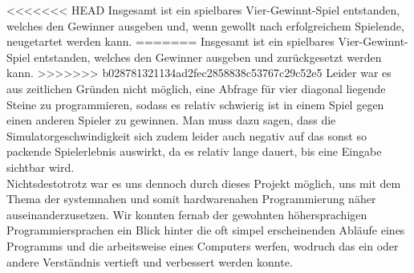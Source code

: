 <<<<<<< HEAD
Insgesamt ist ein spielbares Vier-Gewinnt-Spiel entstanden, welches den Gewinner ausgeben und, wenn gewollt nach erfolgreichem Spielende, neugetartet werden kann.
=======
Insgesamt ist ein spielbares Vier-Gewinnt-Spiel entstanden, welches den Gewinner ausgeben und zurückgesetzt werden kann.
>>>>>>> b028781321134ad2fec2858838c53767c29c52e5
Leider war es aus zeitlichen Gründen nicht möglich, eine Abfrage für vier diagonal liegende Steine zu programmieren, sodass es relativ schwierig ist in einem Spiel gegen einen anderen Spieler zu gewinnen.
Man muss dazu sagen, dass die Simulatorgeschwindigkeit sich zudem leider auch negativ auf das sonst so packende Spielerlebnis auswirkt, da es relativ lange dauert, bis eine Eingabe sichtbar wird.\\
Nichtsdestotrotz war es uns dennoch durch dieses Projekt möglich, uns mit dem Thema der systemnahen und somit hardwarenahen Programmierung näher auseinanderzusetzen. Wir konnten fernab der gewohnten höhersprachigen Programmiersprachen ein Blick hinter die oft simpel erscheinenden Abläufe eines Programms und die arbeitsweise eines Computers werfen, wodruch das ein oder andere Verständnis vertieft und verbessert werden konnte.


